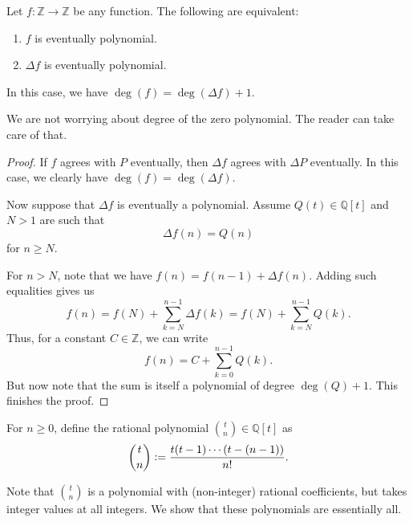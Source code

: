\documentclass[12pt]{article}
\begin{document}
\begin{prop} \label{prop:eventually-polynomial-iff-difference}
	Let $f : \mathbb{Z} \to \mathbb{Z}$ be any function. The following are equivalent:
	\begin{enumerate}
		\item $f$ is eventually polynomial.
		\item $\Delta f$ is eventually polynomial.
	\end{enumerate}
	In this case, we have $\deg(f) = \deg(\Delta f) + 1$.
\end{prop}
We are not worrying about degree of the zero polynomial. The reader can take care of that.
\begin{proof} 
	If $f$ agrees with $P$ eventually, then $\Delta f$ agrees with $\Delta P$ eventually. In this case, we clearly have $\deg(f) = \deg(\Delta f)$.

	Now suppose that $\Delta f$ is eventually a polynomial. Assume $Q(t) \in \mathbb{Q}[t]$ and $N > 1$ are such that
	\begin{equation*} 
		\Delta f(n) = Q(n)
	\end{equation*}
	for $n \ge N$.

	For $n > N$, note that we have $f(n) = f(n - 1) + \Delta f(n)$. Adding such equalities gives us
	\begin{equation*} 
		f(n) = f(N) + \sum_{k = N}^{n - 1} \Delta f(k) = f(N) + \sum_{k = N}^{n - 1} Q(k).
	\end{equation*}
	Thus, for a constant $C \in \mathbb{Z}$, we can write
	\begin{equation*} 
		f(n) = C + \sum_{k = 0}^{n - 1} Q(k).
	\end{equation*}
	But now note that the sum is itself a polynomial of degree $\deg(Q) + 1$. This finishes the proof.
\end{proof}

\begin{defn}
	For $n \ge 0$, define the rational polynomial $\binom{t}{n} \in \mathbb{Q}[t]$ as
	\begin{equation*} 
		\binom{t}{n} \vcentcolon= \frac{t(t - 1) \cdots (t - (n - 1))}{n!}.
	\end{equation*}
\end{defn}

Note that $\binom{t}{n}$ is a polynomial with (non-integer) rational coefficients, but takes integer values at all integers. We show that these polynomials are essentially all.
\end{document}

